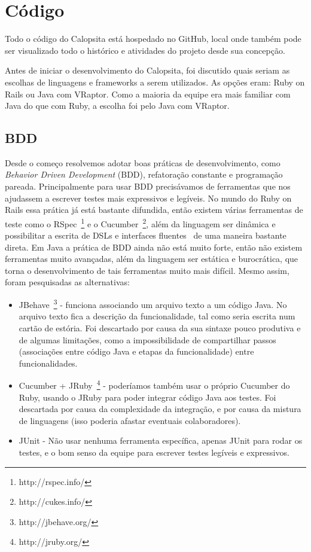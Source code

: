 \section{Código}
Todo o código do Calopsita está hospedado no GitHub, local onde também pode ser visualizado todo o histórico e atividades do projeto desde sua concepção.

Antes de iniciar o desenvolvimento do Calopsita, foi discutido quais seriam as escolhas de linguagens e frameworks a serem utilizados. As opções eram: Ruby on Rails ou Java com VRaptor. Como a maioria da equipe era mais familiar com Java do que com Ruby, a escolha foi pelo Java com VRaptor.

\subsection{BDD}
Desde o começo resolvemos adotar boas práticas de desenvolvimento, como {\it Behavior Driven Development} (BDD), 
refatoração constante e programação pareada. Principalmente para usar BDD precisávamos de ferramentas que nos 
ajudassem a escrever testes mais expressivos e legíveis. No mundo do Ruby on Rails essa prática já está bastante 
difundida, então existem várias ferramentas de teste como o RSpec~\footnote{http://rspec.info/} e o Cucumber~\footnote{http://cukes.info/}, além da linguagem ser dinâmica e possibilitar a escrita de DSLs e interfaces fluentes~\cite{dsl} de uma maneira bastante direta. Em Java a prática de BDD ainda não está muito forte, então não existem ferramentas muito avançadas, além da linguagem ser estática e burocrática, que torna o desenvolvimento de tais ferramentas muito mais difícil. Mesmo assim, foram pesquisadas as alternativas:

\begin{itemize}
	\item{JBehave~\footnote{http://jbehave.org/} - funciona associando um arquivo texto a um código Java. No arquivo texto fica a descrição da funcionalidade, tal como seria escrita num cartão de estória. Foi descartado por causa da sua sintaxe pouco produtiva e de algumas limitações, como a impossibilidade de compartilhar passos (associações entre código Java e etapas da funcionalidade) entre funcionalidades.}
	\item{Cucumber + JRuby~\footnote{http://jruby.org/} - poderíamos também usar o próprio Cucumber do Ruby, usando o JRuby para poder integrar código 
Java aos testes. Foi descartada por causa da complexidade da integração, e por causa da mistura de linguagens (isso poderia afastar eventuais colaboradores).}
	\item{JUnit - Não usar nenhuma ferramenta específica, apenas JUnit para rodar os testes, e o bom senso da 
equipe para escrever testes legíveis e expressivos.}
\end{itemize}

